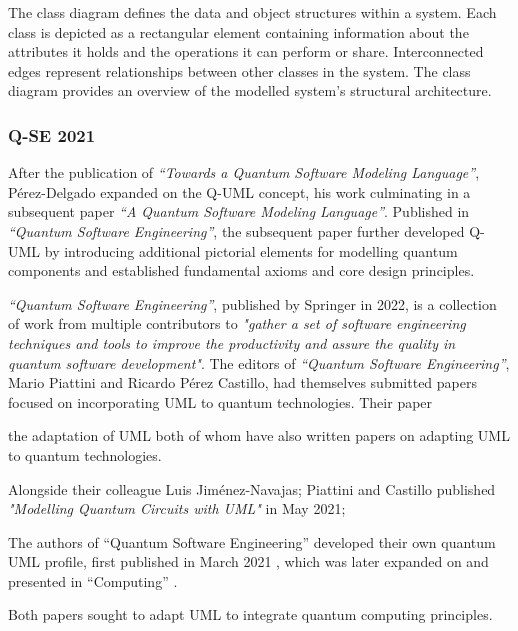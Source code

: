 \documentclass{article}
\newcounter{subsubsubsection}[subsubsection]
\begin{document}
{

The class diagram defines the data and object structures within a system\cite{Seidl_Scholz_Huemer_Kappel_Duffy_2014}. Each class is depicted as a rectangular element containing information about the attributes it holds and the operations it can perform or share. Interconnected edges represent relationships between other classes in the system. The class diagram provides an overview of the modelled system's structural architecture.

\subsubsection{Q-SE 2021}

After the publication of \textit{“Towards a Quantum Software Modeling Language”}\cite{Perez-Delgado2020}, Pérez-Delgado expanded on the Q-UML concept, his work culminating in a subsequent paper \textit{“A Quantum Software Modeling Language”}\cite{Pérez-Delgado2022}. Published in \textit{“Quantum Software Engineering”}\cite{serrano2022quantum}, the subsequent paper further developed Q-UML by introducing additional pictorial elements for modelling quantum components and established fundamental axioms and core design principles\cite{Pérez-Delgado2022}.

\textit{“Quantum Software Engineering”}\cite{serrano2022quantum}, published by Springer in 2022, is a collection of work from multiple contributors to \textit{"gather a set of software engineering techniques and tools to improve the productivity and assure the quality in quantum software development"}\cite{perez-castillo2022quantum}. The editors of \textit{“Quantum Software Engineering”}, Mario Piattini and Ricardo Pérez Castillo, had themselves submitted papers focused on incorporating UML to quantum technologies. Their paper 

the adaptation of UML  both of whom have also written papers on adapting UML to quantum technologies. 

Alongside their colleague Luis Jiménez-Navajas; Piattini and Castillo published \textit{"Modelling Quantum Circuits with UML"} in May 2021; 

The authors of “Quantum Software Engineering” \cite{serrano2022quantum} developed their own quantum UML profile, first published in March 2021 \cite{Pérez-Castillo2021}, which was later expanded on and presented in “Computing” \cite{Pérez-Castillo2022}.

Both papers sought to adapt UML to integrate quantum computing principles. 

}
\end{document}
